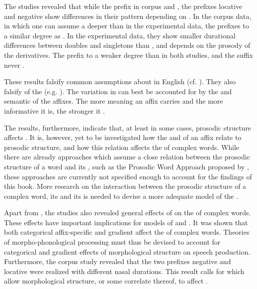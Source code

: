  
The studies revealed that while the prefix   in corpus and , the prefixes locative  and negative  show differences in their  pattern depending on . In the corpus data, in which one can assume a deeper  than in the experimental data, the prefixes  to a similar degree as . In the experimental data, they show smaller durational differences between doubles and singletons than , and  depends on the prosody of the derivatives. The prefix   to a weaker degree than  in both studies, and the suffix   never .

These results falsify common assumptions about  in English (cf. ). They also falsify  of the  (e.g. \citealt{Kiparsky.1982,Kiparsky.1985,Mohanan.1986,BermudezOtero.2012,Kiparsky.2015,BermudezOtero.2017}). 
The variation in  can best be accounted for by the  and semantic  of the affixes. The more meaning an affix carries and the more informative it is, the stronger it . 

The results, furthermore, indicate that, at least in some cases, prosodic structure affects . It is, however, yet to be investigated how the  and  of an affix relate to prosodic structure, and how this relation affects the  of complex words. 
While there are already approaches which assume a close relation between the prosodic structure of a word and its , such as the Prosodic Word Approach proposed by \cite{Raffelsiefen.1999}, these approaches are currently not specified enough to account for the findings of this book.  More research on the interaction between the prosodic structure of a complex word, its  and its   is needed to devise a more adequate model of the .

Apart from , the studies also revealed general effects of  on the  of complex words. These effects have important implications for models of  and . It was shown that both categorical affix-specific  and gradient  affect the  of complex words. Theories of morpho-phonological processing must thus be devised to account for categorical and gradient effects of morphological structure on speech production.
Furthermore, the corpus study revealed that the two  prefixes negative  and locative  were realized with different nasal durations. This result calls for  which allow morphological structure, or some correlate thereof, to affect . 


